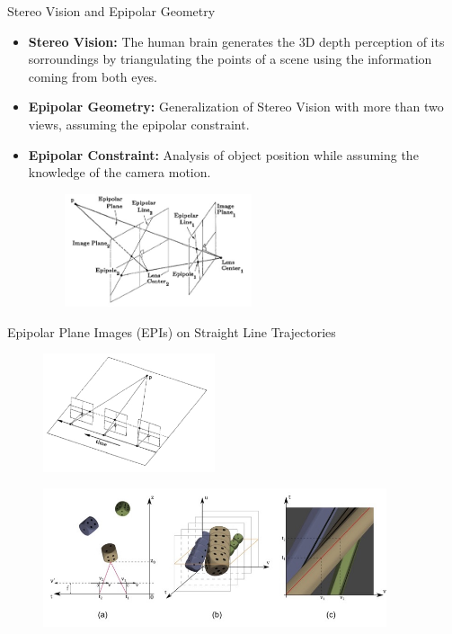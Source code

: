 \begin{frame}{Stereo Vision and Epipolar Geometry}
\begin{block}{}
\begin{itemize}
\item \textbf{Stereo Vision:} The human brain generates the 3D depth perception of its sorroundings by triangulating the points of a scene using the information coming from both eyes.

\pause
\item \textbf{Epipolar Geometry:} Generalization of Stereo Vision with more than two views, assuming the epipolar constraint.

\pause
\item \textbf{Epipolar Constraint:} Analysis of object position while assuming the knowledge of the camera motion.
\pause
\begin{figure}[h!]
\centering
\includegraphics[width=0.52\textwidth]{../../Diagrams/epipolarline.jpg}
\end{figure}
 
\end{itemize}
\end{block}
\end{frame}

\begin{frame}{Epipolar Plane Images (EPIs) on Straight Line Trajectories}
\begin{figure}[h!]
\centering
\includegraphics[width=0.45\textwidth]{../../Diagrams/perp-move.jpg}
\end{figure}

\pause
\begin{figure}[h!]
\centering
\includegraphics[width=0.90\textwidth]{../../Diagrams/EPI-dices.jpg}
\end{figure}

\end{frame}


